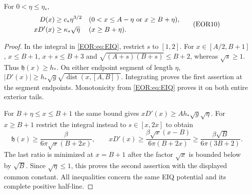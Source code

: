 \documentclass[11pt,a4paper]{article}
\begin{document}
\begin{QOTlemma}
For $0<\eta\le\eta_*$,
\begin{equation}
\begin{aligned}
 D(x)&\ge c_*\eta^{3/2}
        &&(0<x\le A-\eta\ \hbox{or}\ x\ge B+\eta),\\
 xD'(x)&\ge\kappa_*\sqrt\eta&& (x\ge B+\eta).
\end{aligned}\label{EOR:eq:gap}
\tag{EOR10}
\end{equation}
\end{QOTlemma}
\begin{proof}
In the integral in \eqref{EOR:eq:EIQ}, restrict $s$ to $[1,2]$. For
$x\in[A/2,B+1]$, $x\le B+1$, $x+s\le B+3$ and
$\sqrt{(A+s)(B+s)}\le B+2$, whereas $\sqrt s\ge1$.
Thus $\mathfrak h(x)\ge h_*$. On either endpoint segment of length $\eta$,
$|D'(x)|\ge h_*\sqrt g\sqrt{\operatorname{dist}(x,[A,B])}$.
Integrating proves the first assertion at the segment endpoints. Monotonicity
from \eqref{EOR:eq:EIQ} proves it on both entire exterior tails.

For $B+\eta\le x\le B+1$ the same bound gives
$xD'(x)\ge A h_*\sqrt g\sqrt\eta$.
For $x\ge B+1$ restrict the integral instead to $s\in[x,2x]$ to obtain
\[
 \mathfrak h(x)\ge\frac{\beta}{6\pi\sqrt x(B+2x)},\qquad
 xD'(x)\ge\frac{\beta\sqrt x(x-B)}{6\pi(B+2x)}
 \ge\frac{\beta\sqrt B}{6\pi(3B+2)}.
\]
The last ratio is minimized at $x=B+1$ after the factor $\sqrt x$ is bounded
below by $\sqrt B$. Since $\sqrt\eta\le1$, this proves the second assertion
with the displayed common constant. All inequalities concern the same EIQ
potential and its complete positive half-line.
\end{proof}
\end{document}
